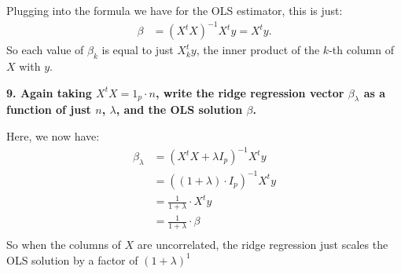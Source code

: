 \documentclass[12pt,hidelinks]{article}
\numberwithin{equation}{section}
\begin{document}
Plugging into the formula we have for the OLS estimator, this is just:
\begin{align}
\beta &= (X^t X)^{-1} X^t y = X^t y.
\end{align}
So each value of $\beta_k$ is equal to just $X_k^t y$, the inner product of the $k$-th
column of $X$ with $y$.

\vspace*{12pt}

\textbf{9. Again taking $X^t X = 1_p \cdot n$, write the ridge regression vector
$\beta_\lambda$ as a function of just $n$, $\lambda$, and the OLS solution $\beta$.}

\vspace*{12pt}

Here, we now have:
\begin{align}
\beta_\lambda &= (X^t X + \lambda I_p)^{-1} X^t y\\
&= ((1 + \lambda) \cdot I_p)^{-1} X^t y \\
&= \frac{1}{1+\lambda} \cdot X^t y \\
&= \frac{1}{1+\lambda} \cdot \beta \\
\end{align}
So when the columns of $X$ are uncorrelated, the ridge regression just scales
the OLS solution by a factor of $(1 + \lambda)^{1}$
\end{document}
